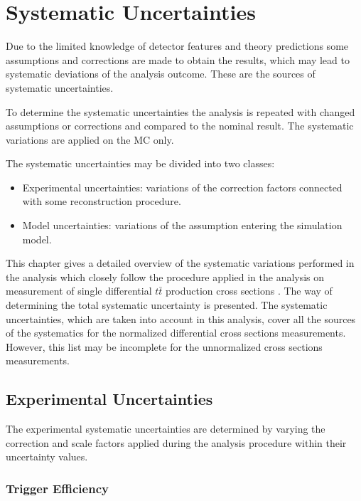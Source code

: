 \chapter{Systematic Uncertainties}\label{chapt:syst}

Due to the limited knowledge of detector features and theory predictions some assumptions and corrections are
made to obtain the results, which may lead to systematic deviations of the analysis outcome.
These are the sources of systematic uncertainties.

To determine the systematic uncertainties the analysis is repeated with changed assumptions or corrections and compared
to the nominal result. The systematic variations are applied on the MC only.

The systematic uncertainties may be divided into two classes:
\begin{itemize}
 \item Experimental uncertainties: variations of the correction factors connected with some reconstruction procedure.
 \item Model uncertainties: variations of the assumption entering the simulation model.
\end{itemize}

This chapter gives a detailed overview of the systematic variations performed in the analysis which closely follow the
procedure applied in the analysis on measurement of single differential $t\bar{t}$ production cross sections \cite{Asin2014Auth}. 
The way of determining the total systematic uncertainty is presented. The systematic uncertainties, which are taken into
account in this analysis, cover all the sources of the systematics for the normalized differential cross sections 
measurements. However, this list may be incomplete for the unnormalized cross sections measurements.

\section{Experimental Uncertainties}

The experimental systematic uncertainties are determined by varying the correction and scale factors applied during the
analysis procedure within their uncertainty values.

\subsection{Trigger Efficiency}

